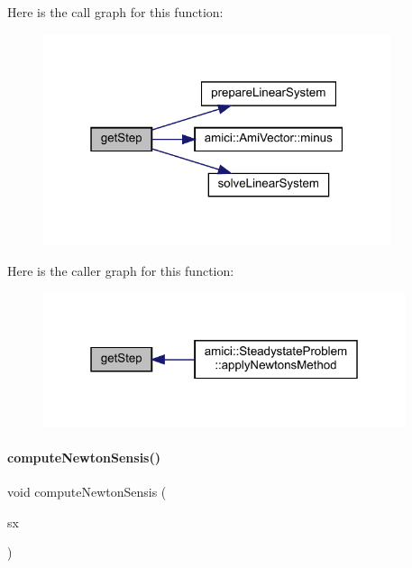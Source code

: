 Here is the call graph for this function\+:
\nopagebreak
\begin{figure}[H]
\begin{center}
\leavevmode
\includegraphics[width=289pt]{classamici_1_1_newton_solver_a7b71b3735b6ca62570266f9d6fce33cb_cgraph}
\end{center}
\end{figure}
Here is the caller graph for this function\+:
\nopagebreak
\begin{figure}[H]
\begin{center}
\leavevmode
\includegraphics[width=301pt]{classamici_1_1_newton_solver_a7b71b3735b6ca62570266f9d6fce33cb_icgraph}
\end{center}
\end{figure}
\mbox{\label{classamici_1_1_newton_solver_a90d4823c7b8373d9aaccba80c930a7c7}} 
\paragraph{\texorpdfstring{compute\+Newton\+Sensis()}{computeNewtonSensis()}}
{\footnotesize\ttfamily void compute\+Newton\+Sensis (\begin{DoxyParamCaption}\item[{\mbox{\hyperlink{classamici_1_1_ami_vector_array}{Ami\+Vector\+Array}} $\ast$}]{sx }\end{DoxyParamCaption})}

